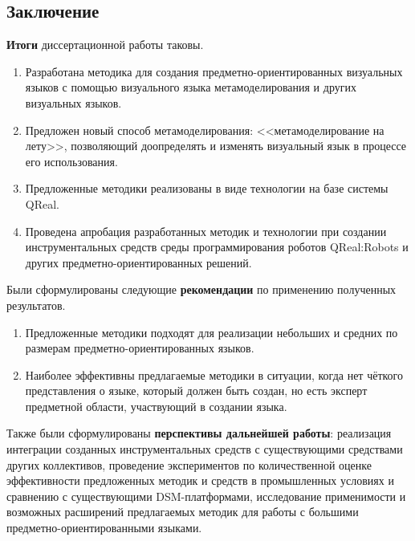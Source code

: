 \subsection*{\Large Заключение}
\textbf{Итоги} диссертационной работы таковы.
\begin{enumerate}
	\item Разработана методика для создания предметно-ориентированных визуальных языков с помощью 
		визуального языка метамоделирования и других визуальных языков.
	\item Предложен новый способ метамоделирования: <<метамоделирование на лету>>, позволяющий
		доопределять и изменять визуальный язык в процессе его использования.
	\item Предложенные методики реализованы в виде технологии на базе системы QReal.
	\item Проведена апробация разработанных методик и технологии при создании инструментальных средств 
		среды программирования роботов QReal:Robots и других предметно-ориентированных решений.
\end{enumerate}
Были сформулированы следующие \textbf{рекомендации} по применению полученных результатов.
\begin{enumerate}
	\item Предложенные методики подходят для реализации небольших и средних по размерам 
		предметно-ориентированных языков.
	\item Наиболее эффективны предлагаемые методики в ситуации, когда нет чёткого представления
		о языке, который должен быть создан, но есть эксперт предметной области, участвующий
		в создании языка.
\end{enumerate}
Также были сформулированы \textbf{перспективы дальнейшей работы}: реализация интеграции 
созданных инструментальных средств с существующими средствами других коллективов, 
проведение экспериментов по количественной оценке эффективности предложенных методик 
и средств в промышленных условиях и сравнению с существующими DSM-платформами, исследование 
применимости и возможных расширений предлагаемых методик для работы с большими предметно-ориентированными 
языками.






















